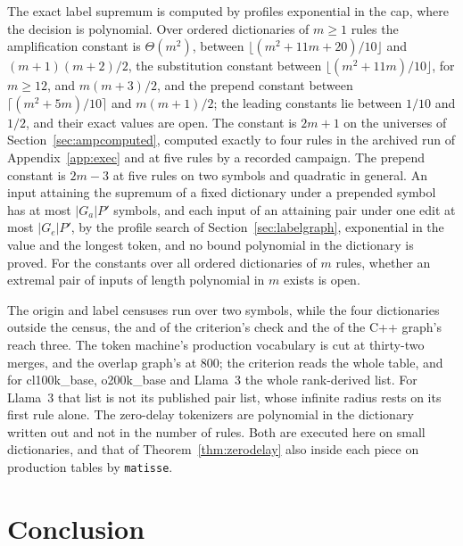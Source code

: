\documentclass[11pt,a4paper]{article}
\theoremstyle{definition}
\theoremstyle{plain}
\newcommand{\code}[1]{\texttt{#1}}
\begin{document}
The exact label supremum is computed by profiles exponential in the cap, where the decision is polynomial. Over ordered
dictionaries of \(m \ge 1\) rules the amplification constant is \(\Theta(m^2)\), between
\(\lfloor (m^2 + 11m + 20)/10 \rfloor\) and \((m + 1)(m + 2)/2\), the substitution constant between
\(\lfloor (m^2 + 11m)/10 \rfloor\), for \(m \ge 12\), and \(m(m + 3)/2\), and the prepend constant between
\(\lceil (m^2 + 5m)/10 \rceil\) and \(m(m + 1)/2\); the leading constants lie between \(1/10\) and \(1/2\), and their
exact values are open. The constant is \(2m + 1\) on the universes of Section~\ref{sec:ampcomputed}, computed exactly to
four rules in the archived run of Appendix~\ref{app:exec} and at five rules by a recorded campaign. The prepend constant
is \(2m - 3\) at five rules on two symbols and quadratic in general. An input attaining the supremum of a fixed
dictionary under a prepended symbol has at most \(|G_a| P'\) symbols, and each input of an attaining pair under one edit
at most \(|G_e| P'\), by the profile search of Section~\ref{sec:labelgraph}, exponential in the value and the longest
token, and no bound polynomial in the dictionary is proved. For the constants over all ordered dictionaries of \(m\)
rules, whether an extremal pair of inputs of length polynomial in \(m\) exists is open.

The origin and label censuses run over two symbols, while the four dictionaries outside the census, the \BeyondProper{}
and \BeyondUnproper{} of the criterion's check and the \CppDictionaries{} of the C++ graph's reach three. The token
machine's production vocabulary is cut at thirty-two merges, and the overlap graph's at 800; the criterion reads the
whole table, and for cl100k\_base, o200k\_base and Llama~3 the whole rank-derived list. For Llama~3 that list is not its
published pair list, whose infinite radius rests on its first rule alone. The zero-delay tokenizers are polynomial in
the dictionary written out and not in the number of rules. Both are executed here on small dictionaries, and that of
Theorem~\ref{thm:zerodelay} also inside each piece on production tables by \code{matisse}.

\section{Conclusion}
\end{document}

